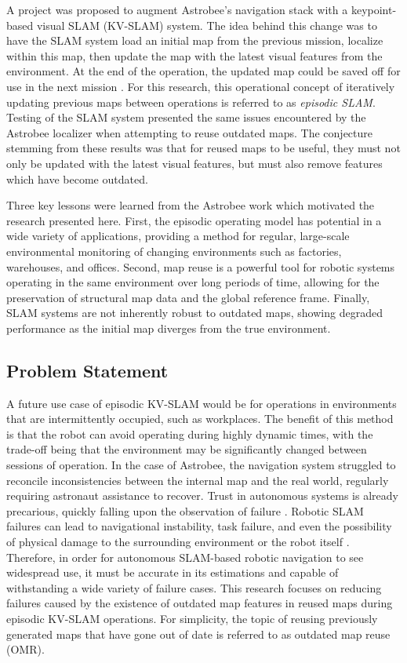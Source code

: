 A project was proposed to augment Astrobee's navigation stack with a keypoint-based visual SLAM (KV-SLAM) system. The idea behind this change was to have the SLAM system load an initial map from the previous mission, localize within this map, then update the map with the latest visual features from the environment. At the end of the operation, the updated map could be saved off for use in the next mission \cite{zuralesCollaborativeSensingMapping2024}. For this research, this operational concept of iteratively updating previous maps between operations is referred to as \textit{episodic SLAM}. Testing of the SLAM system presented the same issues encountered by the Astrobee localizer when attempting to reuse outdated maps. The conjecture stemming from these results was that for reused maps to be useful, they must not only be updated with the latest visual features, but must also remove features which have become outdated.

Three key lessons were learned from the Astrobee work which motivated the research presented here. First, the episodic operating model has potential in a wide variety of applications, providing a method for regular, large-scale environmental monitoring of changing environments such as factories, warehouses, and offices. Second, map reuse is a powerful tool for robotic systems operating in the same environment over long periods of time, allowing for the preservation of structural map data and the global reference frame. Finally, SLAM systems are not inherently robust to outdated maps, showing degraded performance as the initial map diverges from the true environment.

\subsection{Problem Statement}

A future use case of episodic KV-SLAM would be for operations in environments that are intermittently occupied, such as workplaces. The benefit of this method is that the robot can avoid operating during highly dynamic times, with the trade-off being that the environment may be significantly changed between sessions of operation. In the case of Astrobee, the navigation system struggled to reconcile inconsistencies between the internal map and the real world, regularly requiring astronaut assistance to recover. Trust in autonomous systems is already precarious, quickly falling upon the observation of failure \cite{robinetteEffectRobotPerformance2017}. Robotic SLAM failures can lead to navigational instability, task failure, and even the possibility of physical damage to the surrounding environment or the robot itself \cite{nahavandiComprehensiveReviewAutonomous2025}. Therefore, in order for autonomous SLAM-based robotic navigation to see widespread use, it must be accurate in its estimations and capable of withstanding a wide variety of failure cases. This research focuses on reducing failures caused by the existence of outdated map features in reused maps during episodic KV-SLAM operations. For simplicity, the topic of reusing previously generated maps that have gone out of date is referred to as outdated map reuse (OMR).

